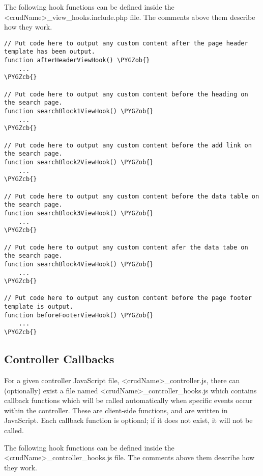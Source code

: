 \documentclass[letterpaper,10pt,english]{sphinxmanual}
\def\PYGZob{\char`\{}
\def\PYGZcb{\char`\}}
\begin{document}
The following hook functions can be defined inside the \textless{}crudName\textgreater{}\_view\_hooks.include.php file.
The comments above them describe how they work.

\begin{Verbatim}[commandchars=\\\{\}]
// Put code here to output any custom content after the page header template has been output.
function afterHeaderViewHook() \PYGZob{}
    ...
\PYGZcb{}

// Put code here to output any custom content before the heading on the search page.
function searchBlock1ViewHook() \PYGZob{}
    ...
\PYGZcb{}

// Put code here to output any custom content before the add link on the search page.
function searchBlock2ViewHook() \PYGZob{}
    ...
\PYGZcb{}

// Put code here to output any custom content before the data table on the search page.
function searchBlock3ViewHook() \PYGZob{}
    ...
\PYGZcb{}

// Put code here to output any custom content afer the data tabe on the search page.
function searchBlock4ViewHook() \PYGZob{}
    ...
\PYGZcb{}

// Put code here to output any custom content before the page footer template is output.
function beforeFooterViewHook() \PYGZob{}
    ...
\PYGZcb{}
\end{Verbatim}


\subsection{Controller Callbacks}
\label{jaxFrameworkGuide:controller-callbacks}
For a given controller JavaScript file, \textless{}crudName\textgreater{}\_controller.js, there can (optionally) exist a
file named \textless{}crudName\textgreater{}\_controller\_hooks.js which contains callback functions which will be called
automatically when specific events occur within the controller.  These are client-side functions,
and are written in JavaScript.  Each callback function is optional; if it does not exist, it will
not be called.

The following hook functions can be defined inside the \textless{}crudName\textgreater{}\_controller\_hooks.js file.
The comments above them describe how they work.
\end{document}
